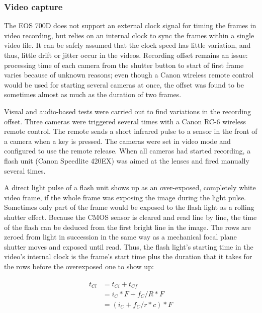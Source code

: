 \subsubsection{Video capture}


The EOS 700D does not support an external clock signal for timing the frames in video recording, but relies on an internal clock to sync the frames within a single video file.
It can be safely assumed that the clock speed has little variation, and thus, little drift or jitter occur in the videos.
Recording offset remains an issue:
processing time of each camera from the shutter button to start of first frame varies because of unknown reasons; even though a Canon wireless remote control would be used for starting several cameras at once, the offset was found to be sometimes almost as much as the duration of two frames.


Visual and audio-based tests were carried out to find variations in the recording offset.
Three cameras were triggered several times with a Canon RC-6 wireless remote control.
The remote sends a short infrared pulse to a sensor in the front of a camera when a key is pressed.
The cameras were set in video mode and configured to use the remote release.
When all cameras had started recording, a flash unit (Canon Speedlite 420EX) was aimed at the lenses and fired manually several times.


A direct light pulse of a flash unit shows up as an over-exposed, completely white video frame, if the whole frame was exposing the image during the light pulse.
Sometimes only part of the frame would be exposed to the flash light as a rolling shutter effect.
Because the CMOS sensor is cleared and read line by line, the time of the flash can be deduced from the first bright line in the image.
The rows are zeroed from light in succession in the same way as a mechanical focal plane shutter moves and exposed until read.
Thus, the flash light's starting time in the video's internal clock is the frame's start time plus the duration that it takes for the rows before the overexposed one to show up:

\begin{align} \begin{split} \label{eq:timingcalib}
t_{Cl} &= t_{Ci} + t_{Cf} \\
&= i_C * F + f_C / R * F \\
&= (i_C + f_C / r * c) * F
\end{split} \end{align}


